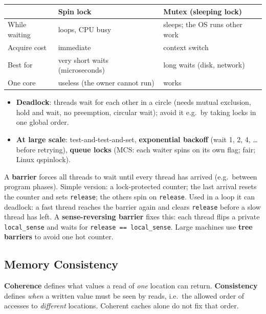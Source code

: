 \begin{center}
\small
\begin{tabular}{@{}lP{5.6cm}P{5.6cm}@{}}
\toprule
& Spin lock & Mutex (sleeping lock) \\
\midrule
While waiting & loops, CPU busy & sleeps; the OS runs other work \\
Acquire cost & immediate & context switch \\
Best for & very short waits (microseconds) & long waits (disk, network) \\
One core & useless (the owner cannot run) & works \\
\bottomrule
\end{tabular}
\end{center}
\begin{itemize}
  \item \textbf{Deadlock}: threads wait for each other in a circle (needs mutual
  exclusion, hold and wait, no preemption, circular wait); avoid it e.g.\ by taking
  locks in one global order.
  \item \textbf{At large scale}: test-and-test-and-set, \textbf{exponential backoff}
  (wait 1, 2, 4, \dots{} before retrying), \textbf{queue locks} (MCS: each waiter
  spins on its own flag; fair; Linux qspinlock).
\end{itemize}

\begin{definition}[Barrier]
A \textbf{barrier} forces all threads to wait until every thread has arrived (e.g.\
between program phases). Simple version: a lock-protected counter; the last arrival
resets the counter and sets \texttt{release}; the others spin on \texttt{release}.
Used in a loop it can deadlock: a fast thread reaches the barrier again and clears
\texttt{release} before a slow thread has left. A \textbf{sense-reversing barrier}
fixes this: each thread flips a private \texttt{local\_sense} and waits for
\texttt{release == local\_sense}.\HPA[15]{I}{\S I.3, Figures~I.2--I.3}{14} Large
machines use \textbf{tree barriers} to avoid one hot counter.
\end{definition}

\subsection{Memory Consistency}
\label{sec:consistency}

\begin{definition}
\textbf{Coherence} defines what values a read of \emph{one} location can return.
\textbf{Consistency} defines \emph{when} a written value must be seen by reads,
i.e.\ the allowed order of accesses to \emph{different} locations. Coherent caches
alone do not fix that order.\HP{\S5.2}{353}
\end{definition}

